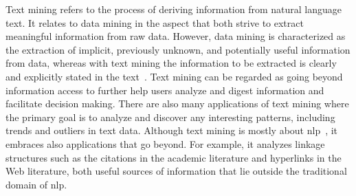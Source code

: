 \documentclass[a4paper,11pt]{article}
\begin{document}
Text mining refers to the process of deriving information from natural language text. It relates to data mining in the aspect that both strive to extract meaningful information from raw data. However, data mining is characterized as the extraction of implicit, previously unknown, and potentially useful information from data, whereas with text mining the information to be extracted is clearly and explicitly stated in the text~\cite{Witten2004}. 
Text mining can be regarded as going beyond information access to further help users analyze and digest information and facilitate decision making. There are also many applications of text mining where the primary goal is to analyze and discover any interesting patterns, including trends and outliers in text data.
Although text mining is mostly about \gls{nlp}~\cite{jurafsky2014speech}, it embraces also applications that go beyond. For example, it analyzes linkage structures such as the citations in the academic literature and hyperlinks in the Web literature, both useful sources of information that lie outside the traditional domain of \gls{nlp}. 
\end{document}
